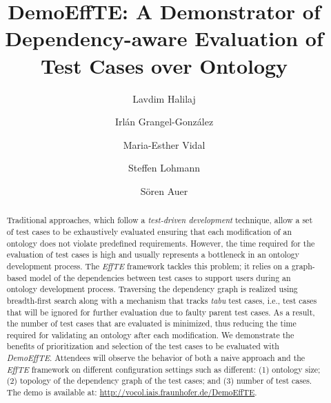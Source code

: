 \documentclass[runningheads,a4paper]{llncs}
\begin{document}
\mainmatter

\title{DemoEffTE: A Demonstrator of Dependency-aware Evaluation of Test Cases over Ontology}
\author{Lavdim Halilaj \and
Irlán Grangel-González \and
Maria-Esther Vidal \and
Steffen Lohmann \and
Sören Auer}
\maketitle

\begin{abstract}
Traditional approaches, which follow a {\em test-driven development} technique, allow a set of test cases to be exhaustively evaluated ensuring that each modification of an ontology does not violate predefined requirements. However, the time required for the evaluation of test cases is high and usually represents a bottleneck in an ontology development process. The {\em EffTE} framework tackles this problem; it relies on a graph-based model of the dependencies between test cases to support users during an ontology development process. Traversing the dependency graph is realized using breadth-first search along with a mechanism that tracks {\em tabu} test cases, i.e., test cases that will be ignored for further evaluation due to faulty parent test cases. As a result, the number of test cases that are evaluated is minimized, thus reducing the time required for validating an ontology after each modification. We demonstrate the benefits of prioritization and selection of the test cases to be evaluated with {\em DemoEffTE}. Attendees will observe the behavior of both a naive approach and the {\em EffTE }framework on different configuration settings such as different: (1) ontology size; (2) topology of the dependency graph of the test cases; and (3) number of test cases. The demo is available at: \url{http://vocol.iais.fraunhofer.de/DemoEffTE}.

\end{abstract}
\end{document}

